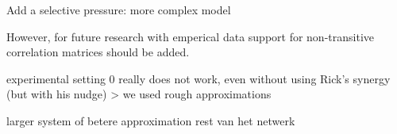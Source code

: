 \documentclass[../main.tex]{subfiles}
\begin{document}
Add a selective pressure: more complex model

However, for future research with emperical data support for non-transitive correlation matrices should be added.

experimental setting 0 really does not work, even without using Rick's synergy (but with his nudge) > we used rough approximations %

larger system of betere approximation rest van het netwerk

\end{document}
